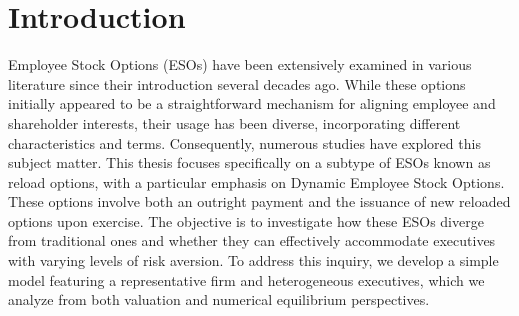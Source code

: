 \section{Introduction}
Employee Stock Options (ESOs) have been extensively examined in various literature since their introduction several decades ago. While these options initially appeared to be a straightforward mechanism for aligning employee and shareholder interests, their usage has been diverse, incorporating different characteristics and terms. Consequently, numerous studies have explored this subject matter. This thesis focuses specifically on a subtype of ESOs known as reload options, with a particular emphasis on Dynamic Employee Stock Options. These options involve both an outright payment and the issuance of new reloaded options upon exercise. The objective is to investigate how these ESOs diverge from traditional ones and whether they can effectively accommodate executives with varying levels of risk aversion. To address this inquiry, we develop a simple model featuring a representative firm and heterogeneous executives, which we analyze from both valuation and numerical equilibrium perspectives.


